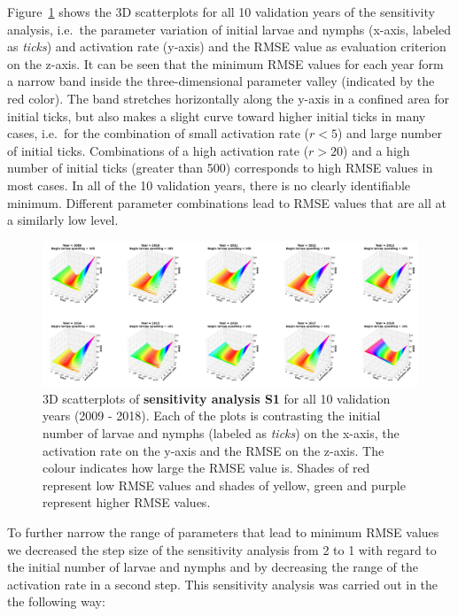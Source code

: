 \documentclass[a4paper, 11pt]{scrartcl}
\begin{document}
Figure~\ref{fig:initial_ticks_with_beech_error_v1} shows the 3D scatterplots for all 10 validation years of the sensitivity analysis, i.e.\ the parameter variation of initial
larvae and nymphs (x-axis, labeled as \textit{ticks}) and activation rate (y-axis) and the RMSE value as evaluation criterion on the z-axis. It can be seen that the minimum RMSE
values for each year form a narrow band inside the three-dimensional parameter valley (indicated by the red color). The band stretches horizontally along the y-axis in a
confined area for initial ticks, but also makes a slight curve toward higher initial ticks in many cases, i.e.\ for the combination of small activation rate ($r < 5$) and large
number of initial ticks. Combinations of a high activation rate ($r > 20$) and a high number of initial ticks (greater than 500) corresponds to high RMSE values in
most cases. In all of the 10 validation years, there is no clearly identifiable minimum. Different parameter combinations lead to RMSE values that are all at a similarly low
level.

\begin{figure}[h!]
\centering
\includegraphics[width=\linewidth]{figures/initial_ticks_with_beech_error_v1}
\caption{3D scatterplots of \textbf{sensitivity analysis S1} for all 10 validation years (2009 - 2018). Each of the plots is contrasting the initial number of larvae and nymphs
(labeled as \textit{ticks}) on the x-axis, the activation rate on the y-axis and the RMSE on the z-axis. The colour indicates how large the RMSE value is. Shades of
red represent low RMSE values and shades of yellow, green and purple represent higher RMSE values.}
\label{fig:initial_ticks_with_beech_error_v1}
\end{figure}

To further narrow the range of parameters that lead to minimum RMSE values we decreased the step size of the sensitivity analysis from 2 to 1 with regard to the initial number of
larvae and nymphs and by decreasing the range of the activation rate in a second step. This sensitivity analysis was carried out in the the following way:
\end{document}
